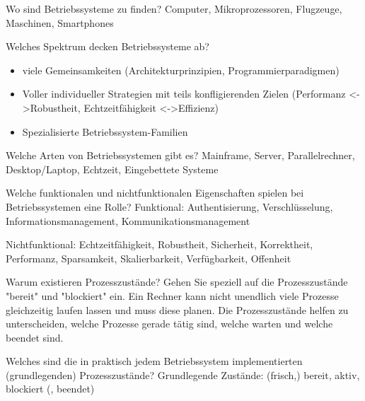 \documentclass[avery5371]{flashcards}
\begin{document}
\begin{flashcard}[Einführung]{Wo sind Betriebssysteme zu finden?}
    Computer, Mikroprozessoren, Flugzeuge, Maschinen, Smartphones
\end{flashcard}

\begin{flashcard}[Einführung]{Welches Spektrum decken Betriebssysteme ab?}
    \begin{itemize}
        \item viele Gemeinsamkeiten (Architekturprinzipien, Programmierparadigmen)
        \item Voller individueller Strategien mit teils konfligierenden Zielen (Performanz <->Robustheit, Echtzeitfähigkeit <->Effizienz)
        \item Spezialisierte Betriebssystem-Familien
    \end{itemize}
\end{flashcard}

\begin{flashcard}[Einführung]{Welche Arten von Betriebssystemen gibt es?}
    Mainframe, Server, Parallelrechner, Desktop/Laptop, Echtzeit, Eingebettete Systeme
\end{flashcard}

\begin{flashcard}[Einführung]{Welche funktionalen und nichtfunktionalen Eigenschaften spielen bei Betriebssystemen eine Rolle?}
    Funktional: Authentisierung, Verschlüsselung, Informationsmanagement, Kommunikationsmanagement

    Nichtfunktional: Echtzeitfähigkeit, Robustheit, Sicherheit, Korrektheit, Performanz, Sparsamkeit, Skalierbarkeit, Verfügbarkeit, Offenheit
\end{flashcard}

\begin{flashcard}{Warum existieren Prozesszustände? Gehen Sie speziell auf die Prozesszustände "bereit" und "blockiert" ein.}
    Ein Rechner kann nicht unendlich viele Prozesse gleichzeitig laufen lassen und muss diese planen. Die Prozesszustände helfen zu unterscheiden, welche Prozesse gerade tätig sind, welche warten und welche beendet sind.
\end{flashcard}

\begin{flashcard}{Welches sind die in praktisch jedem Betriebssystem implementierten (grundlegenden) Prozesszustände?}
    Grundlegende Zustände: (frisch,) bereit, aktiv, blockiert (, beendet) 
\end{flashcard}
\end{document}
